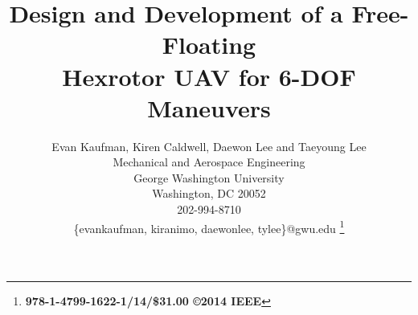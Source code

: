 \documentclass[twocolumn,letterpaper]{IEEEAerospaceCLS}  %
\begin{document}
\title{Design and Development of a Free-Floating\\ Hexrotor UAV for 6-DOF Maneuvers}

\author{%
Evan Kaufman, Kiren Caldwell, Daewon Lee and Taeyoung Lee\\ 
Mechanical and Aerospace Engineering\\
George Washington University\\
Washington, DC 20052\\
202-994-8710\\
\{evankaufman, kiranimo, daewonlee, tylee\}@gwu.edu
\thanks{{\bf 978-1-4799-1622-1/14/\$31.00 \copyright2014 IEEE}} %
}


\maketitle

\thispagestyle{plain}
\pagestyle{plain}
\end{document}
